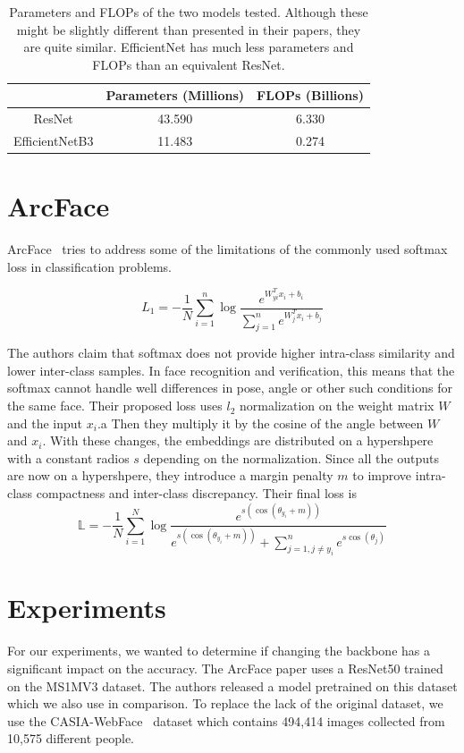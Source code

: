 \documentclass[conference]{IEEEtran}
\begin{document}
\begin{table}
\centering
	\begin{tabular}{|c|c|c|}
		\hline
		& Parameters (Millions) & FLOPs (Billions) \\ \hline
			ResNet & 43.590 & 6.330 \\ \hline
			EfficientNetB3 & 11.483 & 0.274\\ \hline
	\end{tabular}

	\caption{Parameters and FLOPs of the two models tested. Although these might be slightly
	different than presented in their papers, they are quite similar. EfficientNet has much less
	parameters and FLOPs than an equivalent ResNet.}
	\label{tab:params}
\end{table}

\section{ArcFace}
ArcFace~\cite{Deng_2019_CVPR} tries to address some of the limitations of the commonly used
softmax loss in classification problems.

\begin{equation}
		L_1 = -\frac{1}{N}\sum_{i=1}^{n}\log\frac{e^{W^T_{yi}x_i + b_i}}{\sum_{j=1}^{n}e^{W^T_j x_i + b_j}}
\end{equation}

The authors claim that softmax does not provide higher intra-class similarity and lower inter-class samples.
In face recognition and verification, this means that the softmax cannot handle well differences in 
pose, angle or other such conditions for the same face.
Their proposed loss uses $l_2$ normalization on the weight matrix $W$  and the
input $x_i$.a
Then they multiply it by the cosine of the angle between $W$ and $x_i$.
With these changes, the embeddings are distributed on a hypershpere with a constant radios $s$
depending on the normalization.
Since all the outputs are now on a hypershpere, they introduce a margin penalty $m$
to improve intra-class compactness and inter-class discrepancy.
Their final loss is
\begin{equation}
		\mathbb{L} = -\frac{1}{N}\sum_{i=1}^{N}\log\frac{e^{s(\cos(\theta_{y_i}+m))}}{e^{s(\cos(\theta_{y_i} + m))} + \sum_{j=1, j\neq y_i}^{n}e^{s\cos(\theta_j)}}
\end{equation}

\section{Experiments}
For our experiments, we wanted to determine if changing the backbone has a significant impact on the accuracy.
The ArcFace paper uses a ResNet50 trained on the MS1MV3 dataset.
The authors released a model pretrained on this dataset which we also use in comparison.
To replace the lack of the original dataset, we use the CASIA-WebFace~\cite{casiawebface} dataset which 
contains 494,414 images collected from 10,575 different people.
\end{document}
